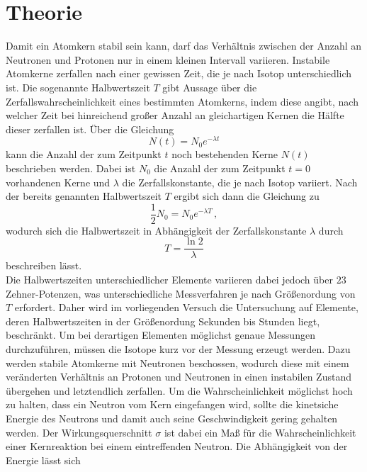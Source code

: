 \section{Theorie}
\label{sec:Theorie}

Damit ein Atomkern stabil sein kann, darf das Verhältnis zwischen der Anzahl an Neutronen und Protonen nur in einem 
kleinen Intervall variieren. Instabile Atomkerne zerfallen nach einer gewissen Zeit, die je nach Isotop unterschiedlich ist.
Die sogenannte Halbwertszeit $T$ gibt Aussage über die Zerfallswahrscheinlichkeit eines bestimmten Atomkerns, indem diese angibt,
nach welcher Zeit bei hinreichend großer Anzahl an gleichartigen Kernen die Hälfte dieser zerfallen ist. Über die Gleichung 
\begin{equation}
    N(t) = N_0 e^{-\lambda t}
    \label{eqn:nt}
\end{equation}
kann die Anzahl der zum Zeitpunkt $t$ noch bestehenden Kerne $N(t)$ beschrieben werden. Dabei ist $N_0$ die Anzahl der zum 
Zeitpunkt $t=0$ vorhandenen Kerne und $\lambda$ die Zerfallskonstante, die je nach Isotop variiert. Nach der bereits genannten 
Halbwertszeit $T$ ergibt sich dann die Gleichung zu 
\begin{equation}
    \frac{1}{2}N_0 = N_0 e^{-\lambda T}\,,
\end{equation}
wodurch sich die Halbwertszeit in Abhängigkeit der Zerfallskonstante $\lambda$ durch 
\begin{equation}
    T = \frac{\ln{2}}{\lambda}
    \label{eqn:T}
\end{equation}
beschreiben lässt.
\\
Die Halbwertszeiten unterschiedlicher Elemente variieren dabei jedoch über $23$ Zehner-Potenzen, was unterschiedliche 
Messverfahren je nach Größenordung von $T$ erfordert. Daher wird im vorliegenden Versuch die Untersuchung auf Elemente, deren 
Halbwertszeiten in der Größenordung Sekunden bis Stunden liegt, beschränkt. Um bei derartigen Elementen möglichst genaue Messungen
durchzuführen, müssen die Isotope kurz vor der Messung erzeugt werden. Dazu werden stabile Atomkerne mit Neutronen beschossen, 
wodurch diese mit einem veränderten Verhältnis an Protonen und Neutronen in einen instabilen Zustand übergehen und letztendlich
zerfallen. Um die Wahrscheinlichkeit möglichst hoch zu halten, dass ein Neutron vom Kern eingefangen wird, sollte die kinetsiche
Energie des Neutrons und damit auch seine Geschwindigkeit gering gehalten werden. Der Wirkungsquerschnitt $\sigma$ ist dabei ein
Maß für die Wahrscheinlichkeit einer Kernreaktion bei einem eintreffenden Neutron. Die Abhängigkeit von der Energie lässt sich 
